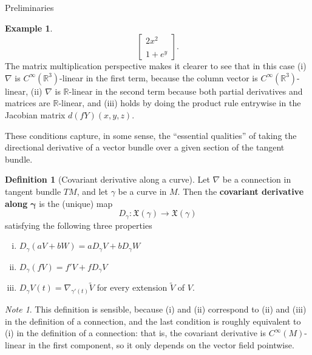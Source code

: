 \documentclass{article}
\newcommand{\fn}[3]{#1 \colon #2 \rightarrow #3}
\theoremstyle{definition}
\newtheorem{definition}{Definition}[section]
\newtheorem{example}{Example}[section]
\theoremstyle{remark}
\newtheorem{remark}{Note}[section]
\begin{document}
\begin{section}{Preliminaries}
\begin{example}
\[\begin{bmatrix}
        2x^2 \\~\\ 1 + e^y
      \end{bmatrix}.
    \] The matrix multiplication perspective makes it clearer to see that in
    this case (i) $\nabla$ is $C^\infty(\mathbb R^3)$-linear in the first
    term, because the column vector is $C^\infty(\mathbb R^3)$-linear,
    (ii) $\nabla$ is $\mathbb R$-linear in the second term because both partial
    derivatives and matrices are $\mathbb R$-linear, and (iii) holds by doing
    the product rule entrywise in the Jacobian matrix $d(fY)(x,y,z)$.
  \end{example}
  These conditions capture, in some sense, the ``essential qualities'' of
  taking the directional derivative of a vector bundle over a given section of
  the tangent bundle.

  \begin{definition}[Covariant derivative along a curve]
    Let $\nabla$ be a connection in tangent bundle $TM$, and let $\gamma$ be a
    curve in $M$. Then the \textbf{covariant derivative along} $\boldsymbol{\gamma}$ is the
    (unique) map \[
      \fn {D_\gamma }{\mathfrak X(\gamma)}{\mathfrak X(\gamma)}
    \] satisfying the following three properties \begin{enumerate}[(i)]
      \item $\displaystyle D_\gamma (aV + bW) = aD_\gamma V + bD_\gamma W$
      \item $\displaystyle D_\gamma (fV) = f'V + fD_\gamma V$
      \item $\displaystyle D_\gamma V(t) = \nabla_{\gamma'(t)}\widetilde{V}$ for every extension $\widetilde V$ of $V$.
    \end{enumerate}
  \end{definition}
  \begin{remark}
    This definition is sensible, because (i) and (ii) correspond to (ii) and
    (iii) in the definition of a connection, and the last condition is roughly
    equivalent to (i) in the definition of a connection: that is, the covariant
    derivative is $C^\infty(M)$-linear in the first component, so it only
    depends on the vector field pointwise.
  \end{remark}


\end{section}
\end{document}
